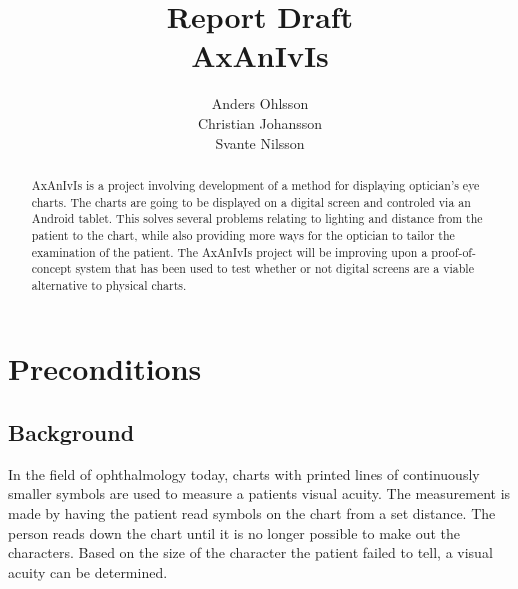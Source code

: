 \documentclass[12pt,a4paper,notitlepage]{report}
\begin{document}
\title{Report Draft\\AxAnIvIs}
\author{Anders Ohlsson\\Christian Johansson\\Svante Nilsson}
\maketitle

\begin{abstract}
AxAnIvIs is a project involving development of a method for displaying optician's eye charts. The charts are going to be displayed on a digital screen and controled via an Android tablet. This solves several problems relating to lighting and distance from the patient to the chart, while also providing more ways for the optician to tailor the examination of the patient. The AxAnIvIs project will be improving upon a proof-of-concept system that has been used to test whether or not digital screens are a viable alternative to physical charts.
\end{abstract}
\thispagestyle{empty}
\clearpage

\setcounter{page}{1}
\chapter{Preconditions}

\section{Background}
In the field of ophthalmology today, charts with printed lines of continuously smaller symbols are used to measure a patients visual acuity. The measurement is made by having the patient read symbols on the chart from a set distance. The person reads down the chart until it is no longer possible to make out the characters. Based on the size of the character the patient failed to tell, a visual acuity can be determined. 

\end{document}
